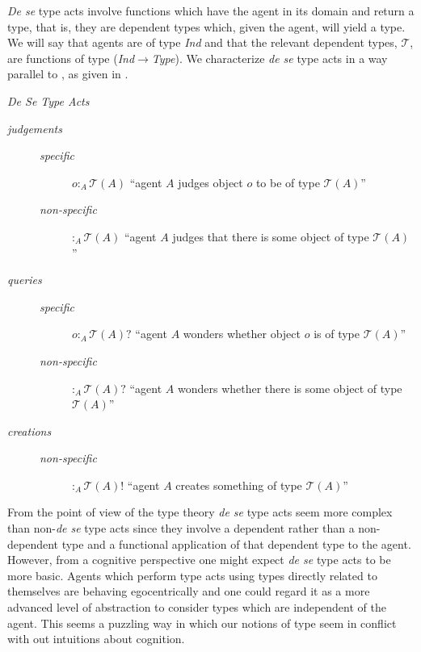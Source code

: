 \textit{De se} type acts involve functions which have the agent in its
domain and return a type, that is, they are dependent types which,
given the agent, will yield a type.  We will say that agents are of
type \textit{Ind} and that the relevant dependent types, 
$\mathcal{T}$, are functions of type
  (\textit{Ind}$\rightarrow$\textit{Type}).  
We characterize \textit{de se} type acts in a way parallel to
\preveg{}, as given in \nexteg{}.
\begin{ex}
\textit{De Se Type Acts} 
\begin{description}
\item[\textit{judgements}] \mbox{}
\begin{description}
\item[\textit{specific}]  $o:_A \mathcal{T}(A)$ ``agent $A$ judges object $o$ to be of type
  $\mathcal{T}(A)$''
\item[\textit{non-specific}] $:_A \mathcal{T}(A)$ ``agent $A$ judges
  that there is some object of type $\mathcal{T}(A)$''
\end{description}

\item[\textit{queries}] \mbox{}
\begin{description}
\item[\textit{specific}] $o:_A \mathcal{T}(A)?$ ``agent $A$ wonders whether object $o$ is of type
  $\mathcal{T}(A)$''
\item[\textit{non-specific}] $:_A \mathcal{T}(A)?$ ``agent $A$ wonders whether there is some object of type
$\mathcal{T}(A)$''
\end{description}

\item[\textit{creations}] \mbox{}
\begin{description}
\item[\textit{non-specific}] $:_A \mathcal{T}(A)!$ ``agent $A$ creates
  something of type $\mathcal{T}(A)$''
\end{description}
\end{description} 
\end{ex} 

From the point of view of the type theory \textit{de se} type acts
seem more complex than non-\textit{de se} type acts since they involve
a dependent rather than a non-dependent type and a functional
application of that dependent type to the agent.  However, from a
cognitive perspective one might expect \textit{de se} type acts to be
more basic.  Agents which perform type acts using types directly
related to themselves are behaving egocentrically and one could regard
it as a more advanced level of abstraction to consider types which are
independent of the agent.  This seems a puzzling way in which our
notions of type seem in conflict with out intuitions about cognition.   

